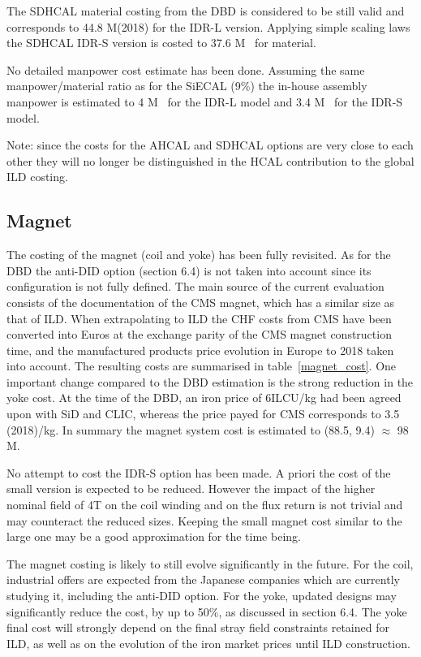 The SDHCAL material costing from the DBD is considered to be still valid and corresponds to 44.8 M\texteuro(2018) for the IDR-L version. Applying simple scaling laws the SDHCAL IDR-S version is costed to 37.6 M\texteuro~ for material.

No detailed manpower cost estimate has been done. Assuming the same manpower/material ratio as for the SiECAL (9\%) the in-house assembly manpower is estimated to 4 M\texteuro~ for the IDR-L model and 3.4 M\texteuro~ for the IDR-S model.

Note: since the costs for the AHCAL and SDHCAL options are very close to each other they will no longer be distinguished in the HCAL contribution to the global ILD costing.

\subsection{Magnet}
The costing of the magnet (coil and yoke) has been fully revisited. As for the DBD the anti-DID option (section 6.4) is not taken into account since its configuration is not fully defined. The main source of the current evaluation consists of the documentation of the CMS magnet, which has a similar size as that of ILD. When extrapolating to ILD the CHF costs from CMS have been converted into Euros at the exchange parity of the CMS magnet construction time, and the manufactured products price evolution in Europe to 2018 taken into account. The resulting costs are summarised in table~\ref{magnet_cost}. One important change compared to the DBD estimation is the strong reduction in the yoke cost. At the time of the DBD, an iron price of 6ILCU/kg had been agreed upon with SiD and CLIC, whereas the price payed for CMS corresponds to 3.5 \texteuro(2018)/kg. 
In summary the magnet system cost is estimated to (88.5, 9.4) $\approx$ 98 M\texteuro.

No attempt to cost the IDR-S option has been made. A priori the cost of the small version is expected to be reduced. However the impact of the higher nominal field of 4T on the coil winding and on the flux return is not trivial and may counteract the reduced sizes. Keeping the small magnet cost similar to the large one may be a good approximation for the time being.

The magnet costing is likely to still evolve significantly in the future. For the coil, industrial offers are expected from the Japanese companies which are currently studying it, including the anti-DID option. For the yoke, updated designs may significantly reduce the cost, by up to 50\%, as discussed in section 6.4. The yoke final cost will strongly depend on the final stray field constraints retained for ILD, as well as on the evolution of the iron market prices until ILD construction.

